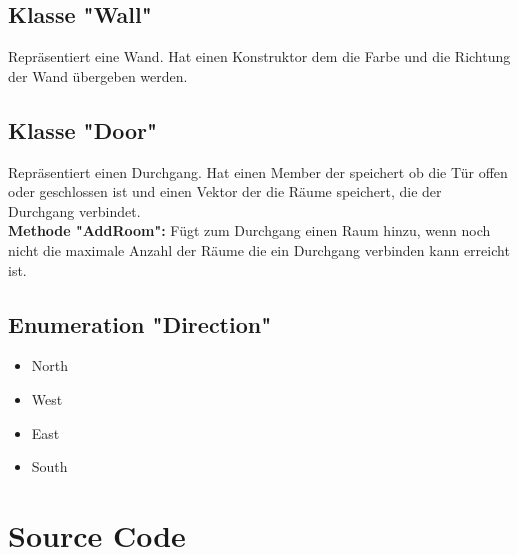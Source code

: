 \documentclass[12pt,a4paper]{article}
\begin{document}
\subsection {Klasse "Wall"} 
Repräsentiert eine Wand. Hat einen Konstruktor dem die Farbe und die Richtung der Wand übergeben werden. \\

\subsection {Klasse "Door"} 
Repräsentiert einen Durchgang. Hat einen Member der speichert ob die Tür offen oder geschlossen ist und einen Vektor der die Räume speichert, die der Durchgang verbindet. \\

\textbf {Methode "AddRoom":}
Fügt zum Durchgang einen Raum hinzu, wenn noch nicht die maximale Anzahl der Räume die ein Durchgang verbinden kann erreicht ist.

\subsection {Enumeration "Direction"}
\begin {itemize}
	\item North
	\item West
	\item East
	\item South
\end {itemize}


\newpage
\section {Source Code}


\newpage


\newpage

\newpage


\newpage

\newpage


\newpage

\newpage


\newpage

\newpage

\end{document}
